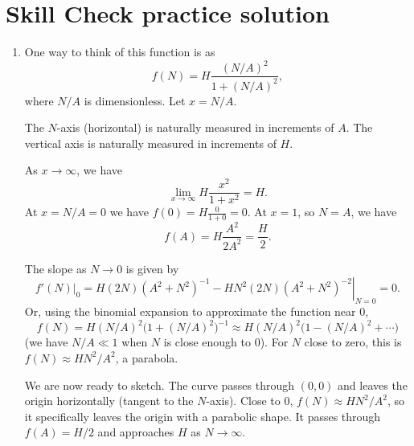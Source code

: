\documentclass[12pt]{amsart}
\theoremstyle{conjecture}
\theoremstyle{definition}
\theoremstyle{question}
\theoremstyle{theorem}
\begin{document}
    \section*{Skill Check practice solution}
    \begin{enumerate}
        \item One way to think of this function is as
        \[
            f(N)=H\frac{(N/A)^2}{1+(N/A)^2},
        \]
        where $N/A$ is dimensionless. Let $x=N/A$.

        The $N$-axis (horizontal) is naturally measured in increments of $A$. The vertical axis is
        naturally measured in increments of $H$.

        As $x\to\infty$, we have
        \[
            \lim_{x\to\infty}H\frac{x^2}{1+x^2}=H.
        \]
        At $x=N/A=0$ we have $f(0)=H\frac{0}{1+0}=0$. At $x=1$, so $N=A$, we have
        \[
            f(A)=H\frac{A^2}{2A^2}=\frac{H}{2}.
        \]

        The slope as $N\to0$ is given by
        \[
            \left.f'(N)\right|_0
            =\left.H(2N)(A^2+N^2)^{-1}-HN^2(2N)(A^2+N^2)^{-2}\right|_{N=0}=0.
        \]
        Or, using the binomial expansion to approximate the function near $0$,
        \[
            f(N)=H(N/A)^2\bigl(1+(N/A)^2\bigr)^{-1}
            \approx H(N/A)^2\bigl(1-(N/A)^2+\cdots\bigr)
        \]
        (we have $N/A\ll1$ when $N$ is close enough to $0$). For $N$ close to zero, this is
        $f(N)\approx HN^2/A^2$, a parabola.

        We are now ready to sketch. The curve passes through $(0,0)$ and leaves the origin horizontally
        (tangent to the $N$-axis). Close to $0$, $f(N)\approx HN^2/A^2$, so it specifically leaves the
        origin with a parabolic shape. It passes through $f(A)=H/2$ and approaches $H$ as $N\to\infty$.

        \begin{center}
        \end{center}
    \end{enumerate}
\end{document}
